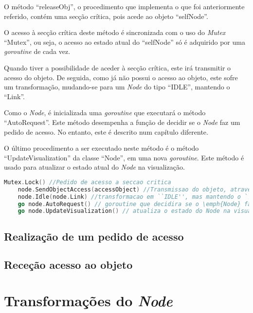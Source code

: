 O método ``releaseObj'', o procedimento que implementa o que foi anteriormente referido, contém uma secção crítica,
pois acede ao objeto ``selfNode''. 

O acesso à secção crítica deste método é sincronizada com o uso do \emph{Mutex} ``Mutex'', ou seja,
o acesso ao estado atual do ``selfNode'' só é adquirido por uma \emph{goroutine} de cada vez.

Quando tiver a possibilidade de aceder à secção crítica, este irá transmitir o acesso do objeto. 
De seguida, como já não possui o acesso ao objeto, este sofre um transformação, mudando-se para um \emph{Node}
do tipo ``IDLE'', mantendo o ``Link''.

Como o \emph{Node}, é inicializada uma \emph{goroutine} que executará o método ``AutoRequest''.
Este método desempenha a função de decidir se o \emph{Node} faz um pedido de acesso. 
No entanto, este é descrito num capítulo diferente.

O último procedimento a ser executado neste método é o método ``UpdateVisualization'' da classe ``Node'', em uma nova \emph{goroutine}.
Este método é usado para atualizar o estado atual do \emph{Node} na visualização.

\begin{lstlisting}[caption={Acesso à secção crítica, transmição do Objeto, transformação em \emph{Node} ``IDLE'', \emph{goroutine} de decisão de pedido, e atualização na visualização},language=Go]
	Mutex.Lock() //Pedido de acesso a seccao critica
	node.SendObjectAccess(accessObject) //Transmissao do objeto, atraves do envio do objeto ``accessObject''
	node.Idle(node.Link) //transformacao em ``IDLE'', mas mantendo o ``Link''
	go node.AutoRequest() // goroutine que decidira se o \emph{Node} faz um pedido de acesso
	go node.UpdateVisualization() // atualiza o estado do Node na visualizacao

\end{lstlisting}


\subsection{Realização de um pedido de acesso}
\subsection{Receção acesso ao objeto}

\section{Transformações do \emph{Node}}

